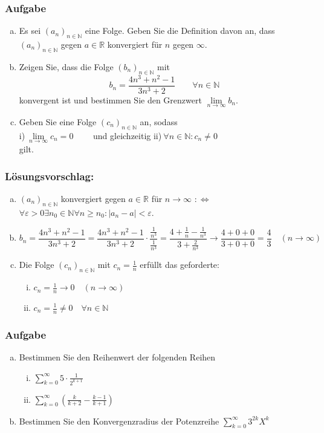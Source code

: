 \documentclass[a4paper,11pt]{scrartcl}
\newcounter{auf}
\newcommand{\Aufgabe}%
        {\addtocounter{auf}{1} \subsubsection*{\rmfamily  Aufgabe \theauf \hspace{1em}} }
\newcommand{\N}{\mathbb{N}}
\newcommand{\RR}{\mathbb{R}}
\begin{document}
\Aufgabe

\begin{enumerate}[a)]

\item Es sei $(a_n)_{n \in \N}$ eine Folge. Geben Sie die Definition davon an, dass $(a_n)_{n \in \N}$ gegen $a \in \RR$ konvergiert für $n$ gegen $\infty$.
\item Zeigen Sie, dass die Folge $(b_n)_{n \in \N}$ mit 
$$
b_n=\frac{4n^3+n^2-1}{3n^3+2} \qquad \forall n \in \N
$$
konvergent ist und bestimmen Sie den Grenzwert $\lim \limits_{n\to \infty} b_n$.
\item Geben Sie eine Folge $(c_n)_{n \in \N}$ an, sodass \vspace{3mm}\\
\hspace*{5mm} i)$\ \lim \limits_{n \to \infty}c_n=0 \qquad$ und gleichzeitig \qquad ii)$\ \forall n \in \N: c_n \ne 0$ \vspace{3mm}\\
gilt.
\end{enumerate}

\subsubsection*{Lösungsvorschlag:}
	\begin{enumerate}[a)]
	\item $(a_n)_{n \in \N}$ konvergiert gegen $a \in \RR$ für $n \to \infty$ $:\Leftrightarrow$ $\forall \varepsilon >0 \exists n_0 \in \N \forall n \ge n_0: |a_n-a|<\varepsilon$.
	\item 
	$$
	b_n=\frac{4n^3+n^2-1}{3n^3+2}=\frac{4n^3+n^2-1}{3n^3+2}\cdot \frac{\frac{1}{n^3}}{\frac{1}{n^3}}=\frac{4+\frac{1}{n}-\frac{1}{n^3}}{3+\frac{2}{n^3}} \to \frac{4+0+0}{3+0+0}=\frac{4}{3} \quad (n \to \infty)
	$$
	\item Die Folge $(c_n)_{n \in \N}$ mit $c_n=\frac{1}{n}$ erfüllt das geforderte:
		\begin{enumerate}[i)]
		\item $c_n=\frac{1}{n} \to 0 \quad (n \to \infty)$
		\item $c_n=\frac{1}{n} \ne 0 \quad \forall n \in \N$
		\end{enumerate}
	\end{enumerate}


\newpage
\Aufgabe
\begin{enumerate}[a)]
\item Bestimmen Sie den Reihenwert der folgenden Reihen
	\begin{enumerate}[i)]
	\item $\sum \limits_{k=0}^\infty 5\cdot \frac{1}{2^{k+1}}$
	\item $\sum \limits_{k=0}^\infty\left( \frac{k}{k+2}-\frac{k-1}{k+1}\right)$
	\end{enumerate}
\item Bestimmen Sie den Konvergenzradius der Potenzreihe $\sum \limits_{k=0}^\infty 3^{2k} X^k$
\end{enumerate}
\end{document}
